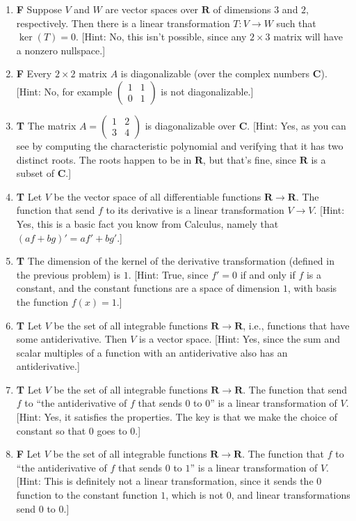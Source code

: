 \documentclass[10pt]{article}
\newcommand{\tf}[3]{\item {\bf {\color{blue}\hspace{1em}#1}}\hspace{1em} #2 [Hint: #3]}
\newcommand{\R}{\mathbf{R}}
\newcommand{\C}{\mathbf{C}}
\begin{document}
\begin{enumerate}
\tf{F}{Suppose $V$ and $W$ are vector spaces over $\R$ of dimensions $3$ and $2$, respectively.
Then there is a linear transformation $T:V\to W$ such that $\ker(T)=0$.}{No, this isn't possible,
since any $2\times 3$ matrix will have a nonzero nullspace.}

\tf{F}{Every $2\times 2$ matrix $A$ is diagonalizable (over the complex numbers $\C$).}
{No, for example $\left(\begin{array}{rr}
1 & 1 \\
0 & 1
\end{array}\right)$ is not diagonalizable.}

\tf{T}{The matrix $A=\left(\begin{array}{rr}
1 & 2 \\
3 & 4
\end{array}\right)$ is diagonalizable over $\C$.}{Yes, as you can see by computing
the characteristic polynomial and verifying that it has two distinct roots.
The roots happen to be in $\R$, but that's fine, since $\R$ is a subset of $\C$.}

\tf{T}{Let $V$ be the vector space of all differentiable functions $\R\to \R$.
The function that send $f$ to its derivative is a linear transformation $V\to V$.}
{Yes, this is a basic fact you know from Calculus, namely that $(af+bg)' = af' + bg'$.}

\tf{T}{The dimension of the kernel of the derivative
transformation (defined in the previous problem) is $1$.}{True, since $f'=0$ if and only if $f$ is a constant, and
the constant functions are a space of dimension $1$, with basis the function $f(x)=1$.}

\tf{T}{Let $V$ be the set of all integrable functions $\R\to \R$, i.e., functions that
have some antiderivative.  Then $V$ is a vector space.}{Yes, since the sum and scalar multiples of a function
with an antiderivative also has an antiderivative.}

\tf{T}{Let $V$ be the set of all integrable functions $\R\to \R$.
The function that send $f$ to ``the antiderivative of $f$ that sends
$0$ to $0$'' is a linear transformation of $V$.}
{Yes, it satisfies the properties.  The key is that we make the choice of constant so that $0$ goes to $0$.}

\tf{F}{Let $V$ be the set of all integrable functions $\R\to \R$.
The function that $f$ to ``the antiderivative of $f$ that sends
$0$ to $1$'' is a linear transformation of $V$.}{This is definitely
not a linear transformation, since it sends the $0$ function to the constant
function $1$, which is not $0$, and linear transformations send $0$ to $0$.}


\end{enumerate}
\end{document}
